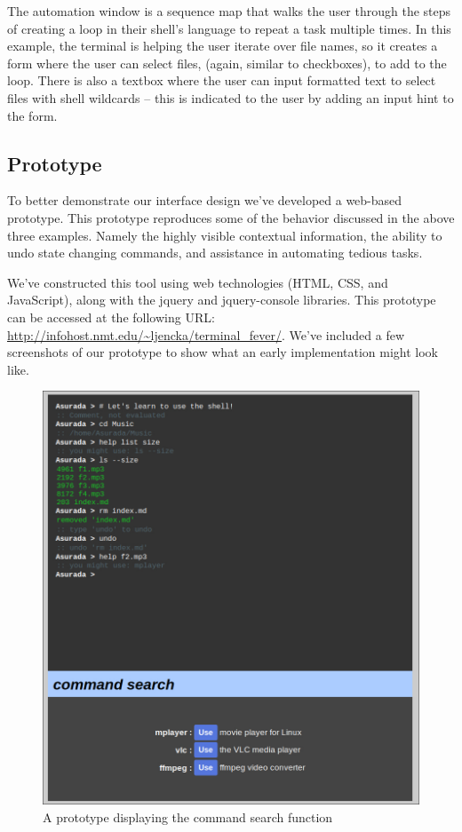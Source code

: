 The automation window is a sequence map that walks the user through the steps of
creating a loop in their shell's language to repeat a task multiple times. In
this example, the terminal is helping the user iterate over file names, so it
creates a form where the user can select files, (again, similar to checkboxes),
to add to the loop. There is also a textbox where the user can input formatted
text to select files with shell wildcards \--- this is indicated to the user by
adding an input hint to the form.

\subsection{Prototype}

To better demonstrate our interface design we've developed a web-based
prototype. This prototype reproduces some of the behavior discussed in the above
three examples. Namely the highly visible contextual information, the ability to
undo state changing commands, and assistance in automating tedious tasks.

We've constructed this tool using web technologies (HTML, CSS, and JavaScript),
along with the jquery and jquery-console libraries. This prototype can be
accessed at the following URL:
\url{http://infohost.nmt.edu/~ljencka/terminal_fever/}. We've included a few
screenshots of our prototype to show what an early implementation might look
like.

\begin{figure}[H]
  \centering
  \includegraphics[width=0.85\linewidth]{figures/prototype/cmd.jpg}
  \caption{A prototype displaying the command search function}
  \label{fig:cmdsearch}
\end{figure}

